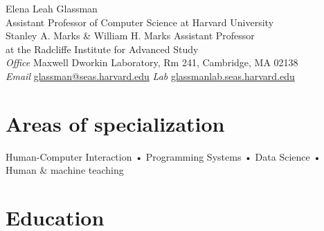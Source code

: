 \documentclass[10pt, a4paper]{article}
\begin{document}
{\LARGE Elena Leah Glassman}\\[0.25cm]
{\large Assistant Professor of Computer Science at Harvard University\\ [0.1cm]
Stanley A. Marks \& William H. Marks Assistant Professor\\at the Radcliffe Institute for Advanced Study}\\[0.5cm]
\textit{Office} Maxwell Dworkin Laboratory, Rm 241, Cambridge, MA 02138\\%
\textit{Email} \href{mailto:glassman@seas.harvard.edu}{glassman@seas.harvard.edu} \textit{Lab} \href{http://glassmanlab.seas.harvard.edu/}{glassmanlab.seas.harvard.edu}




\section*{Areas of specialization}
Human-Computer Interaction • Programming Systems • Data Science • Human \& machine teaching  



\section*{Education}
\noindent
\end{document}
